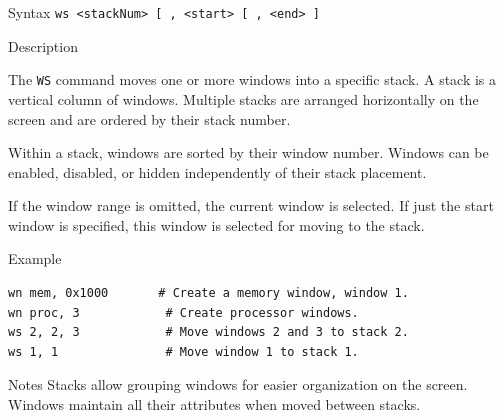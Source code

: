 %
%
\pagebreak
{}

\begin{iPageDescEntry}{Syntax}
\texttt{ws <stackNum> [ , <start> [ , <end> ]} \\
\end{iPageDescEntry}

\begin{iPageDescEntry}{Description}

The \texttt{WS} command moves one or more windows into a specific stack.  
A stack is a vertical column of windows. Multiple stacks are arranged
horizontally on the screen and are ordered by their stack number.

Within a stack, windows are sorted by their window number.  
Windows can be enabled, disabled, or hidden independently of their stack
placement.

If the window range is omitted, the current window is selected. If just the start window is specified, this window is selected for moving to the stack.

\end{iPageDescEntry}

\begin{iPageDescOpEntry}{Example}
\begin{lstlisting}[style=iPageOpStyle]
wn mem, 0x1000       # Create a memory window, window 1.
wn proc, 3            # Create processor windows.
ws 2, 2, 3            # Move windows 2 and 3 to stack 2.
ws 1, 1               # Move window 1 to stack 1.
\end{lstlisting}
\end{iPageDescOpEntry}

\begin{iPageDescEntry}{Notes}
Stacks allow grouping windows for easier organization on the screen.  
Windows maintain all their attributes when moved between stacks.
\end{iPageDescEntry}
